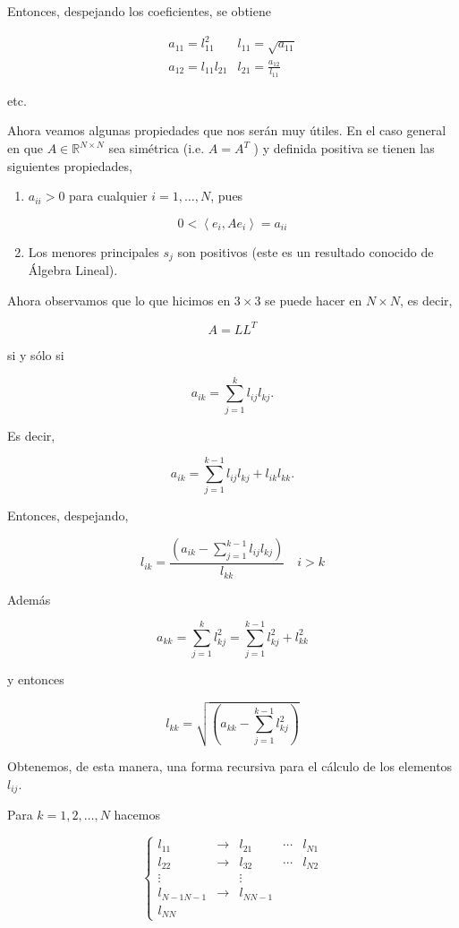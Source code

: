 \documentclass[10pt]{article}
\begin{document}
Entonces, despejando los coeficientes, se obtiene

$$
\begin{array}{cr}
a_{11}=l_{11}^{2} & l_{11}=\sqrt{a_{11}} \\
a_{12}=l_{11} l_{21} & l_{21}=\frac{a_{12}}{l_{11}}
\end{array}
$$

etc.

Ahora veamos algunas propiedades que nos serán muy útiles. En el caso general en que $A \in \mathbb{R}^{N \times N}$ sea simétrica (i.e. $A=A^{T}$ ) y definida positiva se tienen las siguientes propiedades,

\begin{enumerate}
  \item $a_{i i}>0$ para cualquier $i=1, \ldots, N$, pues
\end{enumerate}

$$
0<\left\langle e_{i}, A e_{i}\right\rangle=a_{i i}
$$

\begin{enumerate}
  \setcounter{enumi}{1}
  \item Los menores principales $s_{j}$ son positivos (este es un resultado conocido de Álgebra Lineal).
\end{enumerate}

Ahora observamos que lo que hicimos en $3 \times 3$ se puede hacer en $N \times N$, es decir,

$$
A=L L^{T}
$$

si y sólo si

$$
a_{i k}=\sum_{j=1}^{k} l_{i j} l_{k j} .
$$

Es decir,

$$
a_{i k}=\sum_{j=1}^{k-1} l_{i j} l_{k j}+l_{i k} l_{k k} .
$$

Entonces, despejando,

$$
l_{i k}=\frac{\left(a_{i k}-\sum_{j=1}^{k-1} l_{i j} l_{k j}\right)}{l_{k k}} \quad i>k
$$

Además

$$
a_{k k}=\sum_{j=1}^{k} l_{k j}^{2}=\sum_{j=1}^{k-1} l_{k j}^{2}+l_{k k}^{2}
$$

y entonces

$$
l_{k k}=\sqrt{\left(a_{k k}-\sum_{j=1}^{k-1} l_{k j}^{2}\right)}
$$

Obtenemos, de esta manera, una forma recursiva para el cálculo de los elementos $l_{i j}$.

Para $k=1,2, \ldots, N$ hacemos

$$
\left\{\begin{array}{ccccc}
l_{11} & \rightarrow & l_{21} & \cdots & l_{N 1} \\
l_{22} & \rightarrow & l_{32} & \cdots & l_{N 2} \\
\vdots & & \vdots & & \\
l_{N-1 N-1} & \rightarrow & l_{N N-1} & & \\
l_{N N} & & & &
\end{array}\right.
$$
\end{document}

